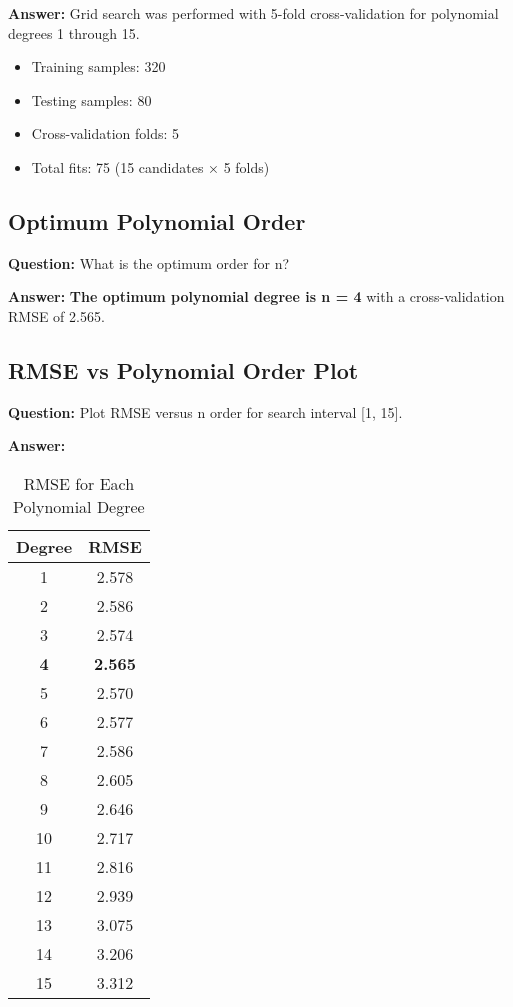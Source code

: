 \documentclass[11pt]{article}
\begin{document}
\textbf{Answer:} Grid search was performed with 5-fold cross-validation for polynomial degrees 1 through 15.

\begin{itemize}
    \item Training samples: 320
    \item Testing samples: 80
    \item Cross-validation folds: 5
    \item Total fits: 75 (15 candidates × 5 folds)
\end{itemize}

\subsection{Optimum Polynomial Order}

\textbf{Question:} What is the optimum order for n?

\textbf{Answer:} \textbf{The optimum polynomial degree is n = 4} with a cross-validation RMSE of 2.565.

\subsection{RMSE vs Polynomial Order Plot}

\textbf{Question:} Plot RMSE versus n order for search interval [1, 15].

\textbf{Answer:}

\begin{table}[H]
\centering
\caption{RMSE for Each Polynomial Degree}
\begin{tabular}{cc}
\toprule
\textbf{Degree} & \textbf{RMSE} \\
\midrule
1 & 2.578 \\
2 & 2.586 \\
3 & 2.574 \\
\textbf{4} & \textbf{2.565} \\
5 & 2.570 \\
6 & 2.577 \\
7 & 2.586 \\
8 & 2.605 \\
9 & 2.646 \\
10 & 2.717 \\
11 & 2.816 \\
12 & 2.939 \\
13 & 3.075 \\
14 & 3.206 \\
15 & 3.312 \\
\bottomrule
\end{tabular}
\end{table}
\end{document}
